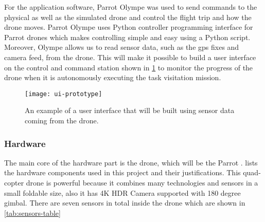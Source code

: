 \documentclass[../main.tex]{subfiles}
\begin{document}
For the application software, Parrot Olympe 
was used to send commands to the physical as well as 
the simulated drone and control the flight trip and 
how the drone moves. Parrot Olympe uses Python 
controller programming interface for Parrot drones 
which makes controlling simple and easy using a 
Python script. Moreover, Olympe allows us to read
sensor data, such as the \gls{gps} fixes and camera feed, 
from the \anafi
drone. This will make it possible to build a user interface
on the control and command station
shown in \cref{fig:ui-prototype} to monitor 
the progress of the drone
when it is autonomously executing the task visitation
mission.

\begin{figure}[tbp]
    \centering
    \texttt{[image: ui-prototype]}
    \caption{An example of a user interface that will be built
                using sensor data coming from the \anafi drone.}
    \label{fig:ui-prototype}
\end{figure}

\subsubsection{Hardware}

The main core of the hardware part is the drone, 
which will be the Parrot \anafi.
 lists the hardware components
used in this project and their justifications. This quad-copter
drone is powerful because it combines many technologies 
and sensors in a small foldable size, also it has 4K HDR Camera supported 
with 180 degree gimbal. 
There are seven sensors in total inside the drone which are shown in 
\cref{tab:sensors-table} 
\end{document}
